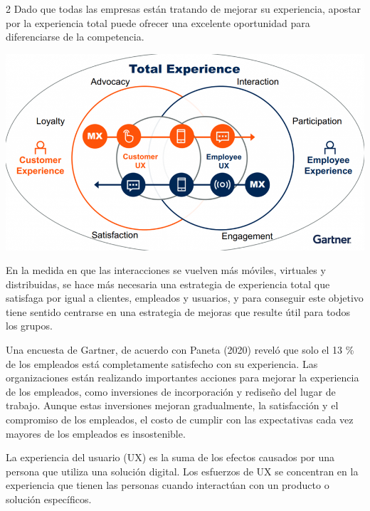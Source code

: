 \documentclass[12pt,spanish,Letterpaper,openany]{book}
\begin{document}
\begin {multicols}{2}
Dado que todas las empresas están tratando de mejorar su experiencia, apostar por la experiencia total puede ofrecer una excelente oportunidad para diferenciarse de la competencia.

\begin {flushleft}
\noindent\begin{minipage}[c]{\columnwidth}

\includegraphics[width=1\linewidth]{images/estrada_01}

\end{minipage}

\end {flushleft}

En la medida en que las interacciones se vuelven más móviles, virtuales y distribuidas, se hace más necesaria una estrategia de experiencia total que satisfaga por igual a clientes, empleados y usuarios, y para conseguir este objetivo tiene sentido centrarse en una estrategia de mejoras que resulte útil para todos los grupos.

Una encuesta de Gartner, de acuerdo con Paneta (2020) reveló que solo el 13 \% de los empleados está completamente satisfecho con su experiencia. Las organizaciones están realizando importantes acciones para mejorar la experiencia de los empleados, como inversiones de incorporación y rediseño del lugar de trabajo. Aunque estas inversiones mejoran gradualmente, la satisfacción y el compromiso de los empleados, el costo de cumplir con las expectativas cada vez mayores de los empleados es insostenible.

La experiencia del usuario (UX) es la suma de los efectos causados por una persona que utiliza una solución digital. Los esfuerzos de UX se concentran en la experiencia que tienen las personas cuando interactúan con un producto o solución específicos.


\end{multicols}
\end{document}
